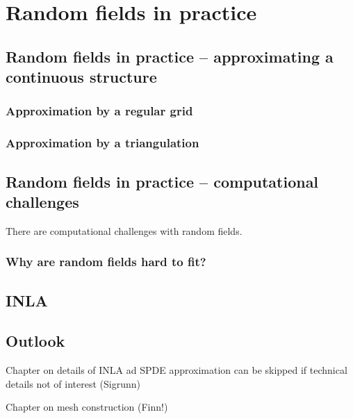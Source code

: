 \chapter{Random fields in practice}

\section{Random fields in practice -- approximating a continuous structure}

\subsection{Approximation by a regular grid}
\subsection{Approximation by a triangulation}

\section{Random fields in practice -- computational challenges}
There are computational challenges with random fields.

\subsection{Why are random fields hard to fit?}

\section{INLA}



\section{Outlook}

Chapter on details of INLA ad SPDE approximation can be skipped if technical details not of interest (Sigrunn)

Chapter on mesh construction (Finn!)
